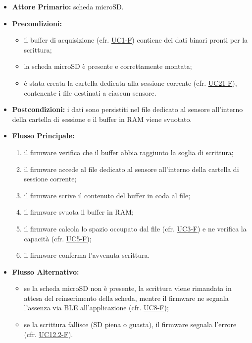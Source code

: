 \begin{itemize}
    \item \textbf{Attore Primario:} scheda microSD.

    \item \textbf{Precondizioni:}
    \begin{itemize}
        \item il buffer di acquisizione (cfr. \hyperref[uc:uc_acquisizione_binaria]{UC1-F}) contiene
        dei dati binari pronti per la scrittura;
        \item la scheda microSD è presente e correttamente montata;
        \item è stata creata la cartella dedicata alla sessione corrente (cfr.
        \hyperref[uc:uc_salvataggio_calibrazioni]{UC21-F}), contenente i file destinati a ciascun sensore.
    \end{itemize}

    \item \textbf{Postcondizioni:} i dati sono persistiti nel file dedicato al sensore all'interno
    della cartella di sessione e il buffer in RAM viene svuotato.

    \item \textbf{Flusso Principale:}
    \begin{enumerate}
        \item il firmware verifica che il buffer abbia raggiunto la soglia di scrittura;
        \item il firmware accede al file dedicato al sensore all'interno della cartella di sessione corrente;
        \item il firmware scrive il contenuto del buffer in coda al file;
        \item il firmware svuota il buffer in RAM;
        \item il firmware calcola lo spazio occupato dal file (cfr.
        \hyperref[uc:uc_calcolo_spazio]{UC3-F}) e ne verifica la capacità (cfr.
        \hyperref[uc:uc_gestione_capacita]{UC5-F});
        \item il firmware conferma l'avvenuta scrittura.
    \end{enumerate}

    \item \textbf{Flusso Alternativo:}
    \begin{itemize}
        \item se la scheda microSD non è presente, la scrittura viene rimandata in attesa del
        reinserimento della scheda, mentre il firmware ne segnala l'assenza via BLE all'applicazione
        (cfr. \hyperref[uc:uc_notifica_sd_mancante]{UC8-F});
        \item se la scrittura fallisce (SD piena o guasta), il firmware segnala l'errore
        (cfr. \hyperref[uc:uc_led_errore]{UC12.2-F}).
    \end{itemize}


\end{itemize}
